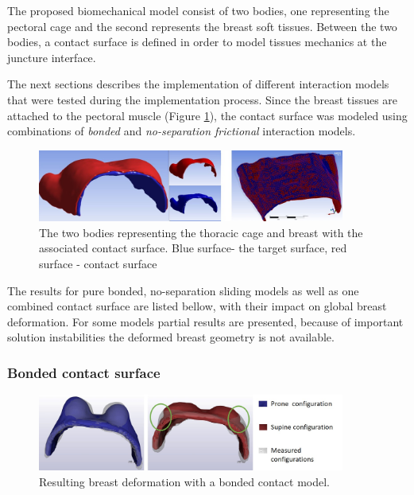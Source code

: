  The proposed biomechanical model consist of two bodies, one representing the pectoral cage  and the second represents the breast soft tissues. Between the two bodies, a contact surface is defined in order to model tissues mechanics at the juncture interface.
 
The next sections describes the implementation of different interaction models that were tested during the implementation process. Since the breast tissues are attached to the pectoral muscle (Figure \ref{fig:contactsurface}), the contact surface was modeled using combinations of \textit{bonded} and \textit{no-separation frictional} interaction models.


\begin{figure}[!h]
\centering
\includegraphics[width=0.9\textwidth,keepaspectratio]{figures/contactSurface.jpg} 
\caption{The two bodies representing the thoracic cage and breast with the associated contact surface.  Blue surface- the target surface, red surface - contact surface}
\label{fig:contactsurface}
\end{figure}

The results for pure bonded, no-separation sliding models as well as one combined contact surface are listed bellow, with their impact on global breast deformation. For some models partial results are presented, because of important solution instabilities  the deformed breast geometry is not available.  


\subsubsection*{Bonded contact surface}



\begin{figure}[!h]
\centering
\includegraphics[width=0.9\textwidth,keepaspectratio]{figures/bondedcontact.jpg} 
\caption{Resulting breast deformation with a bonded contact model.}
\label{fig:bondedcontact}
\end{figure}

